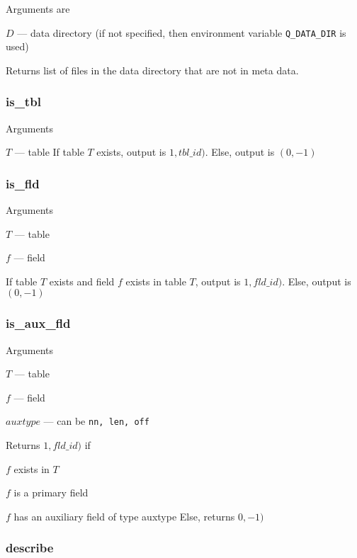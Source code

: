 \documentclass{report}
\begin{document}
Arguments are
\be
\item \(D\) --- data directory (if not specified, then environment
    variable \verb+Q_DATA_DIR+ is used)
\ee

Returns list of files in the data directory that are not in meta data. 

\subsubsection{is\_tbl}
\label{is_tbl}
Arguments 
\be
\item \(T\) --- table
\ee
If table \(T\) exists, output is \(1, tbl\_id)\). Else, 
output is \((0, -1)\)

\subsubsection{is\_fld}
\label{is_fld}
Arguments 
\be
\item \(T\) --- table
\item \(f\) --- field
\ee

If table \(T\) exists and field \(f\) exists in table \(T\), 
output is \(1, fld\_id)\). Else, output is \((0, -1)\)

\subsubsection{is\_aux\_fld}
\label{is_aux_fld}
Arguments 
\be
\item \(T\) --- table
\item \(f\) --- field
\item \(auxtype\) --- can be {\tt nn, len, off}
\ee

Returns \(1, fld\_id)\) if 
\be
\item \(f\) exists in \(T\) 
\item \(f\) is a primary field 
\item \(f\) has an auxiliary field of type auxtype
\ee
Else, returns \(0, -1)\)

\subsubsection{describe}
\label{describe}
\end{document}
